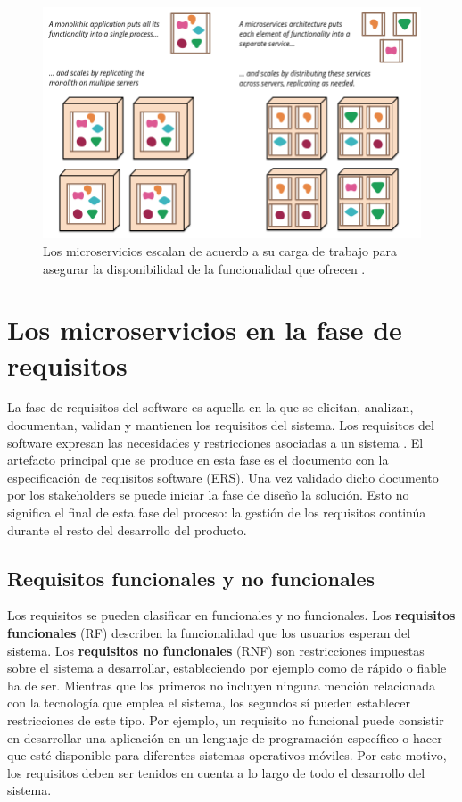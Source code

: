 \documentclass[11pt,spanish,listoffigures]{tfgetsinf}
\begin{document}
\begin{figure}[h]
\centering
\includegraphics[scale=0.4]{microservices_escaling}
\caption{Los microservicios escalan de acuerdo a su carga de trabajo para asegurar la disponibilidad de la funcionalidad que ofrecen \cite{Lewis2014}.}
\end{figure}

\section{Los microservicios en la fase de requisitos}

La fase de requisitos del software es aquella en la que se elicitan, analizan, documentan, validan y mantienen los requisitos del sistema. Los requisitos del software expresan las necesidades y restricciones asociadas a un sistema \cite{Fernandes2016}. El artefacto principal que se produce en esta fase es el documento con la especificación de requisitos software (ERS). Una vez validado dicho documento por los stakeholders se puede iniciar la fase de diseño la solución. Esto no significa el final de esta fase del proceso: la gestión de los requisitos continúa durante el resto del desarrollo del producto.

\subsection{Requisitos funcionales y no funcionales} \label{subsect:RNF}

Los requisitos se pueden clasificar en funcionales y no funcionales. Los \textbf{requisitos funcionales} (RF) describen la funcionalidad que los usuarios esperan del sistema. Los \textbf{requisitos no funcionales} (RNF) son restricciones impuestas sobre el sistema a desarrollar, estableciendo por ejemplo como de rápido o fiable ha de ser. Mientras que los primeros no incluyen ninguna mención relacionada con la tecnología que emplea el sistema, los segundos sí pueden establecer restricciones de este tipo. Por ejemplo, un requisito no funcional puede consistir en desarrollar una aplicación en un lenguaje de programación específico o hacer que esté disponible para diferentes sistemas operativos móviles. Por este motivo, los requisitos deben ser tenidos en cuenta a lo largo de todo el desarrollo del sistema.
\end{document}
